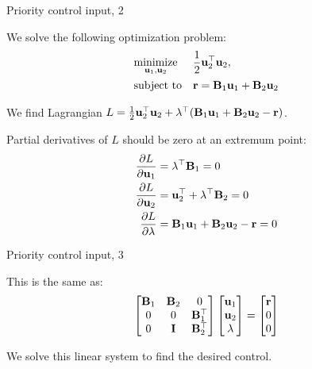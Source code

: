 \documentclass{beamer}
\begin{document}
\begin{frame}{Priority control input, 2}
	\begin{flushleft}
		
		We solve the following optimization problem:
		\begin{equation}
			\begin{aligned}
				& \underset{\mathbf{u}_1, \mathbf{u}_2}{\text{minimize}}
				& & \frac{1}{2} \mathbf{u}_2^\top \mathbf{u}_2, \\
				& \text{subject to}
				& & \mathbf{r} = \mathbf{B}_1\mathbf{u}_1 + \mathbf{B}_2\mathbf{u}_2
			\end{aligned}
		\end{equation}
		
		We find Lagrangian $L = \frac{1}{2} \mathbf{u}_2^\top \mathbf{u}_2 + \lambda^\top (\mathbf{B}_1\mathbf{u}_1 + \mathbf{B}_2\mathbf{u}_2 - \mathbf{r})$.
		
		Partial derivatives of $L$ should be zero at an extremum point:
		\begin{align}
			\frac{\partial L}{\partial \mathbf{u}_1} &=
			\lambda^\top \mathbf{B}_1 = 0
			\\
			\frac{\partial L}{\partial \mathbf{u}_2} &=
			\mathbf{u}_2^\top +
			\lambda^\top \mathbf{B}_2 = 0
			\\
			\frac{\partial L}{\partial \lambda} &=
			\mathbf{B}_1\mathbf{u}_1 + \mathbf{B}_2\mathbf{u}_2 - \mathbf{r} = 0
		\end{align}
		
		
	\end{flushleft}
\end{frame}



\begin{frame}{Priority control input, 3}
	\begin{flushleft}
		
		This is the same as:
		\begin{equation}
			\begin{bmatrix}
				\mathbf{B}_1 & \mathbf{B}_2 & 0 \\
				0 & 0 & \mathbf{B}_1^\top \\
				0 & \mathbf{I} & \mathbf{B}_2^\top
			\end{bmatrix}
			\begin{bmatrix}
			\mathbf{u}_1  \\
			\mathbf{u}_2  \\
			\lambda 
			\end{bmatrix}
			=
			\begin{bmatrix}
			\mathbf{r} \\
			0  \\
			0 
			\end{bmatrix}
		\end{equation}
		
		We solve this linear system to find the desired control.
		
		
	\end{flushleft}
\end{frame}
\end{document}
